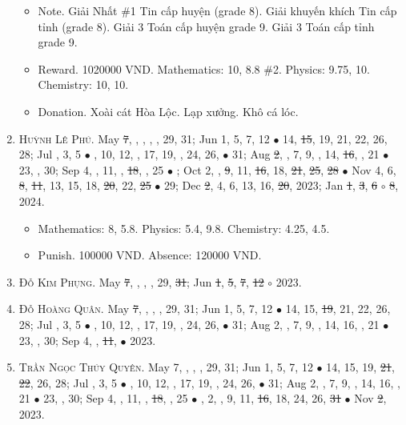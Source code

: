 \documentclass{article}
\begin{document}
\begin{enumerate}
	\begin{itemize}
		\item {\sf Note.} Giải Nhất \#1 Tin cấp huyện (grade 8). Giải khuyến khích Tin cấp tỉnh (grade 8). Giải 3 Toán cấp huyện grade 9. Giải 3 Toán cấp tỉnh grade 9.
		\item {\sf Reward.} 1020000 VND. Mathematics: 10, 8.8 \#2. Physics: 9.75, 10. Chemistry: 10, 10.
		\item {\sf Donation.} Xoài cát Hòa Lộc. Lạp xưởng. Khô cá lóc.
	\end{itemize}
	\item \textsc{Huỳnh Lê Phú.} May \st{7}, , , , , 29, 31; Jun 1, 5, 7, 12 $\bullet$ 14, \st{15}, 19, 21, 22, 26, 28; Jul , 3, 5 $\bullet$ , 10, 12, , 17, 19, , 24, 26,  $\bullet$ 31; Aug \st{2}, , 7, 9, , 14, \st{16}, , 21 $\bullet$ 23, , 30; Sep 4, , 11, , \st{18}, , 25 $\bullet$ ; Oct 2, , \st{9}, 11, \st{16}, 18, \st{21}, \st{25}, \st{28} $\bullet$ Nov 4, 6, \st{8}, \st{11}, 13, 15, 18, \st{20}, 22, \st{25} $\bullet$ 29; Dec \st{2}, 4, 6, 13, 16, \st{20}, 2023; Jan \st{1}, \st{3}, \st{6} $\circ$ \st{8}, 2024. {\sf[Out]}
	\begin{itemize}
		\item Mathematics: 8, 5.8. Physics: 5.4, 9.8. Chemistry: 4.25, 4.5.
		\item {\sf Punish.} 100000 VND. Absence: 120000 VND.
	\end{itemize}
	\item \textsc{Đỗ Kim Phụng.} May \st{7}, , , , 29, \st{31}; Jun \st{1}, \st{5}, \st{7}, \st{12} $\circ$ 2023. {\sf[Out]}
	\item \textsc{Đỗ Hoàng Quân.} May \st{7}, , , , 29, 31; Jun 1, 5, 7, 12 $\bullet$ 14, 15, \st{19}, 21, 22, 26, 28; Jul , 3, 5 $\bullet$ , 10, 12, , 17, 19, , 24, 26,  $\bullet$ 31; Aug 2, , 7, 9, , 14, 16, , 21 $\bullet$ 23, , 30; Sep 4, , \st{11},  $\bullet$ 2023. {\sf[Out]}
	\item \textsc{Trần Ngọc Thúy Quyên.} May 7, , , , 29, 31; Jun 1, 5, 7, 12 $\bullet$ 14, 15, 19, \st{21}, \st{22}, 26, 28; Jul , 3, 5 $\bullet$ , 10, 12, , 17, 19, , 24, 26,  $\bullet$ 31; Aug 2, , 7, 9, , 14, 16, , 21 $\bullet$ 23, , 30; Sep 4, , 11, , \st{18}, , 25 $\bullet$ , 2, , 9, 11, \st{16}, 18, 24, 26, \st{31} $\bullet$ Nov \st{2}, 2023.

\end{enumerate}
\end{document}
